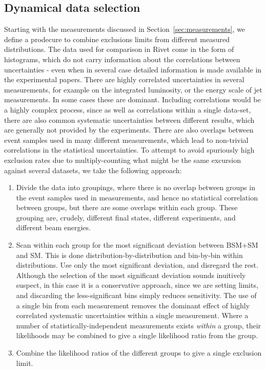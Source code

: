 \documentclass[floatfix]{article}
\begin{document}
\subsection{Dynamical data selection}

Starting with the measurements discussed in Section~\ref{sec:measurements}, we define a prodecure to combine exclusions limits from different measured distributions.
The data used for comparison in Rivet come in the form of histograms, which do not carry information about the correlations between uncertainties - 
even when in several case detailed information is made available in the experimental papers. There are highly correlated uncertainties in several measurements, 
for example on the integrated luminosity, or the energy scale of jet measurements. In some cases these are dominant. Including correlations would be a highly 
complex process, since as well as correlations within a single data-set, there are also common systematic uncertainties between different
results, which are generally not provided by the experiments. There are also overlaps between event samples used in many different measurements, which lead to
non-trivial correlations in the statistical uncertainties. To attempt to avoid spuriously high exclusion rates due to multiply-counting what might be the 
same excursion against several datasets, we take the following approach:
\begin{enumerate}
\item Divide the data into groupings, where there is no overlap between groups in the event samples used in measurements, and hence no statistical correlation 
between groups, but there are some overlaps within each group. These grouping are, crudely, different final states, different experiments, and different beam 
energies.
\item Scan within each group for the most significant deviation between BSM+SM and SM. This is done distribution-by-distribution and bin-by-bin within distributions.
Use only the most significant deviation, and disregard the rest. Although the selection of the most significant deviation sounds inuitively suspect, in this case it
is a conservative approach, since we are setting limits, and discarding the less-significant bins simply reduces sensitivity. 
The use of a single bin from each measurement removes the dominant effect of highly correlated 
systematic uncertainties within a single measurement. Where a number
of statistically-independent measurements exists {\it within} a group, their likelihoods may be combined to give a single likelihood ratio from the group.
\item Combine the likelihood ratios of the different groups to give a single exclusion limit.
\end{enumerate}
\end{document}
